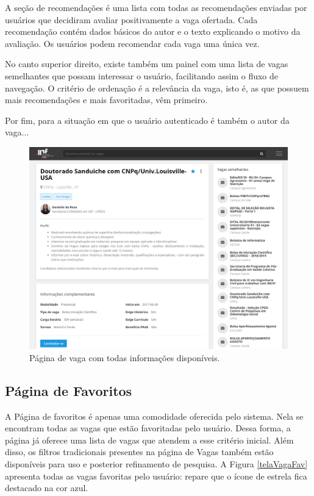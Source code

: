 A seção de recomendações é uma lista com todas as recomendações enviadas por usuários que decidiram avaliar positivamente a vaga ofertada. Cada recomendação contém dados básicos do autor e o texto explicando o motivo da avaliação. Os usuários podem recomendar cada vaga uma única vez.

No canto superior direito, existe também um painel com uma lista de vagas semelhantes que possam interessar o usuário, facilitando assim o fluxo de navegação. O critério de ordenação é a relevância da vaga, isto é, as que possuem mais recomendações e mais favoritadas, vêm primeiro.

Por fim, para a situação em que o usuário autenticado é também o autor da vaga...

\begin{figure}[ht]
    \caption{Página de vaga com todas informações disponíveis.}
       	\begin{center}
            \includegraphics[width=1\textwidth]{figuras/vaga-especifica.png}
        \end{center}
    \label{telaVagaCompleta}
\end{figure}

\subsection{Página de Favoritos}
\label{PDVFunFavoritos}

A Página de favoritos é apenas uma comodidade oferecida pelo sistema. Nela se encontram todas as vagas que estão favoritadas pelo usuário. Dessa forma, a página já oferece uma lista de vagas que atendem a esse critério inicial. Além disso, os filtros tradicionais presentes na página de Vagas também estão disponíveis para uso e posterior refinamento de pesquisa. A Figura \ref{telaVagaFav} apresenta todas as vagas favoritas pelo usuário: repare que o ícone de estrela fica destacado na cor azul.


